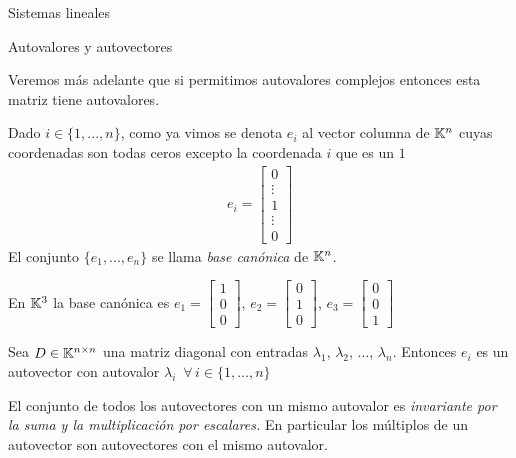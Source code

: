 \begin{chapter}{Sistemas lineales}
\begin{section}{Autovalores y autovectores}
\begin{observacion*}
        Veremos más adelante que si permitimos autovalores complejos entonces esta matriz tiene  autovalores.
        \end{observacion*}

        \begin{definicion}
        
        Dado $i\in\{1, ..., n\}$, como ya vimos se denota \textit{$e_i$} al vector columna de $\mathbb K^n$ cuyas coordenadas son todas ceros excepto la coordenada $i$ que es un $1$
        \begin{align*}
        e_i=\left[
        \begin{array}{c}
        0\\ \vdots\\1\\ \vdots\\0
        \end{array}
        \right]
        \end{align*}
        El conjunto $\{e_1, ..., e_n\}$ se llama \textit{base canónica} de $\mathbb K^n$.
        \end{definicion}

        \begin{ejemplo*}
        En $\mathbb K^3$ la base canónica es  $
        e_1=\left[
        \begin{array}{c}
        1\\0\\0
        \end{array}
        \right]$, $
        e_2=\left[
        \begin{array}{c}
        0\\1\\0
        \end{array}
        \right]$, 
        $
        e_3=\left[
        \begin{array}{c}
        0\\0\\1
        \end{array}
        \right]
        $
        \end{ejemplo*}

        \begin{ejemplo*}
        Sea $D\in\mathbb K^{n\times n}$ una matriz diagonal con entradas $\lambda_1$, $\lambda_2$, ..., $\lambda_n$. Entonces $e_i$ es un autovector con autovalor $\lambda_i$  $\,\forall\, i\in\{1, ..., n\}$
        \end{ejemplo*}

        
         El conjunto de todos los autovectores con un mismo autovalor es \textit{invariante por la suma y la multiplicación por escalares.}	En particular los múltiplos de un autovector son autovectores con el mismo autovalor.
             

\end{section}
\end{chapter}
